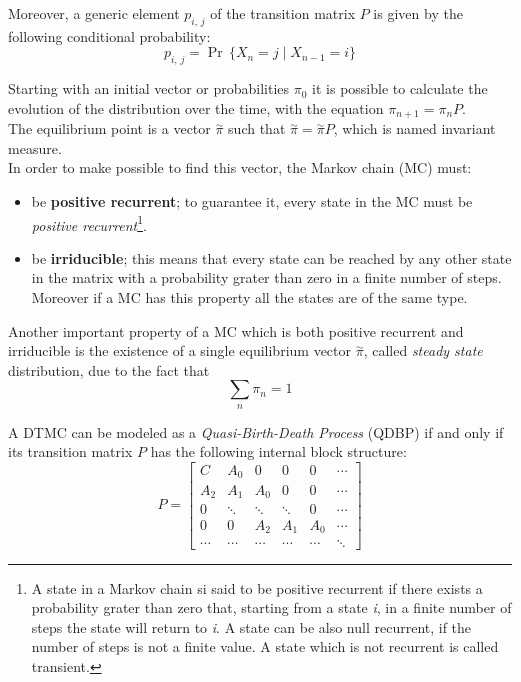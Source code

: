 Moreover, a generic element \(p_{i,\,j}\) of the transition matrix \( P \) is given by the following conditional probability:
\begin{equation*}
  p_{i,\,j} = \Pr\,\{X_{n} = j \mid X_{n-1} = i\}
\end{equation*}

Starting with an initial vector or probabilities \( \pi_{0} \) it is possible to calculate the evolution of the distribution over the time, with the equation \( \pi_{n+1} = \pi_{n}P \).\\
The equilibrium point is a vector \( \overset{\sim}{\pi} \) such that \( \overset{\sim}{\pi} = \overset{\sim}{\pi}P \), which is named invariant measure.\\
In order to make possible to find this vector, the Markov chain (MC) must:
\begin{itemize}
  \item be \textbf{positive recurrent}; to guarantee it, every state in the MC must be \emph{positive recurrent}\footnote{A state in a Markov chain si said to be positive recurrent if there exists a probability grater than zero that, starting from a state \emph{i}, in a finite number of steps the state will return to \emph{i}. A state can be also null recurrent, if the number of steps is not a finite value. A state which is not recurrent is called transient.}. 
  \item be \textbf{irriducible}; this means that every state can be reached by any other state in the matrix with a probability grater than zero in a finite number of steps. Moreover if a MC has this property all the states are of the same type.  
\end{itemize}

Another important property of a MC which is both positive recurrent and irriducible is the existence of a single equilibrium vector \( \overset{\sim}{\pi} \), called \emph{steady state} distribution, due to the fact that
\begin{equation*}
  \displaystyle\sum_{n} \pi_{n} = 1
\end{equation*}

A DTMC can be modeled as a \emph{Quasi-Birth-Death Process} (QDBP) if and only if its transition matrix \( P \) has the following internal block structure:
\begin{equation*} \label{transitionmatrix}
  P = 
  \begin{bmatrix}
    C & A_{0} & 0 & 0 & 0 & \cdots \\
    A_{2} & A_{1} & A_{0} & 0 & 0 & \cdots \\
    0 & \ddots & \ddots & \ddots & 0 & \cdots \\
    0 & 0 & A_{2} & A_{1} & A_{0} & \cdots \\
    \cdots & \cdots & \cdots & \cdots & \cdots & \ddots
  \end{bmatrix}
\end{equation*}

